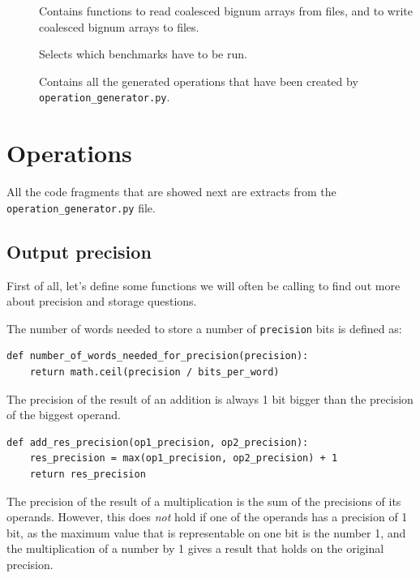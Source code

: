 \documentclass[12pt, a4paper]{report}
\begin{document}
\begin{sloppypar}
\begin{description}
\item[]
Contains functions to read coalesced bignum arrays from files, and to write
coalesced bignum arrays to files.

\item[]
Selects which benchmarks have to be run.

\item[]
Contains all the generated operations that have been created by
\verb+operation_generator.py+.
\end{description}

\section{Operations}
All the code fragments that are showed next are extracts from the
\verb+operation_generator.py+ file.

\subsection{Output precision}
First of all, let's define some functions we will often be calling to find out
more about precision and storage questions.

The number of words needed to store a number of \verb+precision+ bits is defined
as:

\begin{lstlisting}
def number_of_words_needed_for_precision(precision):
    return math.ceil(precision / bits_per_word)
\end{lstlisting}

The precision of the result of an addition is always 1 bit bigger than the
precision of the biggest operand.

\begin{lstlisting}
def add_res_precision(op1_precision, op2_precision):
    res_precision = max(op1_precision, op2_precision) + 1
    return res_precision
\end{lstlisting}

The precision of the result of a multiplication is the sum of the precisions of
its operands.
However, this does \emph{not} hold if one of the operands has a precision of 1
bit, as the maximum value that is representable on one bit is the number 1, and
the multiplication of a number by 1 gives a result that holds on the original
precision.


\end{sloppypar}
\end{document}
